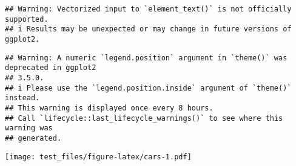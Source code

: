 \documentclass[
]{article}
\begin{document}
\begin{verbatim}
## Warning: Vectorized input to `element_text()` is not officially supported.
## i Results may be unexpected or may change in future versions of ggplot2.
\end{verbatim}

\begin{verbatim}
## Warning: A numeric `legend.position` argument in `theme()` was deprecated in ggplot2
## 3.5.0.
## i Please use the `legend.position.inside` argument of `theme()` instead.
## This warning is displayed once every 8 hours.
## Call `lifecycle::last_lifecycle_warnings()` to see where this warning was
## generated.
\end{verbatim}

\texttt{[image: test\_files/figure-latex/cars-1.pdf]}
\end{document}
